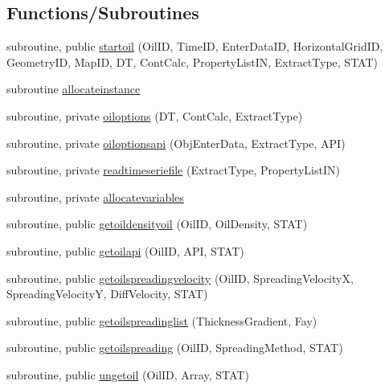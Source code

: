 \subsection*{Functions/\+Subroutines}
\begin{DoxyCompactItemize}
\item 
subroutine, public \mbox{\hyperlink{namespacemoduleoil_a65a42d1b037b7effaac748ed9de641b9}{startoil}} (Oil\+ID, Time\+ID, Enter\+Data\+ID, Horizontal\+Grid\+ID, Geometry\+ID, Map\+ID, DT, Cont\+Calc, Property\+List\+IN, Extract\+Type, S\+T\+AT)
\item 
subroutine \mbox{\hyperlink{namespacemoduleoil_a932062e4d214e9b1e3f8504bad7dee40}{allocateinstance}}
\item 
subroutine, private \mbox{\hyperlink{namespacemoduleoil_aed259a357945d0fe3281c34d220a6dcd}{oiloptions}} (DT, Cont\+Calc, Extract\+Type)
\item 
subroutine, private \mbox{\hyperlink{namespacemoduleoil_a25b9c130249a4691ccc1c06b3bae5a4e}{oiloptionsapi}} (Obj\+Enter\+Data, Extract\+Type, A\+PI)
\item 
subroutine, private \mbox{\hyperlink{namespacemoduleoil_add8d9c35ee53aee7829af9a0f4b3dff4}{readtimeseriefile}} (Extract\+Type, Property\+List\+IN)
\item 
subroutine, private \mbox{\hyperlink{namespacemoduleoil_af70b4b1248473e837294505db4f7ec5b}{allocatevariables}}
\item 
subroutine, public \mbox{\hyperlink{namespacemoduleoil_a957aec9748df48f4722e500b1f600985}{getoildensityoil}} (Oil\+ID, Oil\+Density, S\+T\+AT)
\item 
subroutine, public \mbox{\hyperlink{namespacemoduleoil_abeaffbf39f30e3630cefa9fdf3a69e82}{getoilapi}} (Oil\+ID, A\+PI, S\+T\+AT)
\item 
subroutine, public \mbox{\hyperlink{namespacemoduleoil_a110af1cd38e3c7128a98fb3d2bed2fdb}{getoilspreadingvelocity}} (Oil\+ID, Spreading\+VelocityX, Spreading\+VelocityY, Diff\+Velocity, S\+T\+AT)
\item 
subroutine, public \mbox{\hyperlink{namespacemoduleoil_a4bba14809f66e683d6b93c629e986fc5}{getoilspreadinglist}} (Thickness\+Gradient, Fay)
\item 
subroutine, public \mbox{\hyperlink{namespacemoduleoil_ab0850c594da69306ab36555f8971e6e4}{getoilspreading}} (Oil\+ID, Spreading\+Method, S\+T\+AT)
\item 
subroutine, public \mbox{\hyperlink{namespacemoduleoil_a2fe92325448f8b8b46f0b9a6c44129c1}{ungetoil}} (Oil\+ID, Array, S\+T\+AT)
\item 

\end{DoxyCompactItemize}
